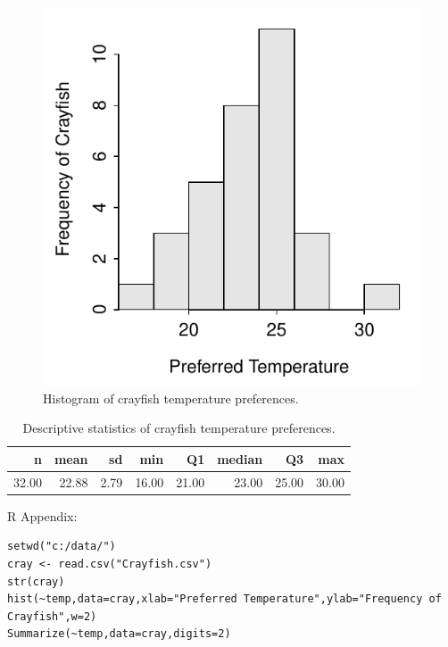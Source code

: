 \documentclass[10pt,openany]{book}\usepackage[]{graphicx}\usepackage[]{color}
\makeatletter
\newenvironment{kframe}{%
 \def\at@end@of@kframe{}%
 \ifinner\ifhmode%
  \def\at@end@of@kframe{\end{minipage}}%
  \begin{minipage}{\columnwidth}%
 \fi\fi%
 \def\FrameCommand##1{\hskip\@totalleftmargin \hskip-\fboxsep
 \colorbox{shadecolor}{##1}\hskip-\fboxsep
     \hskip-\linewidth \hskip-\@totalleftmargin \hskip\columnwidth}%
 \MakeFramed {\advance\hsize-\width
   \@totalleftmargin\z@ \linewidth\hsize
   \@setminipage}}%
 {\par\unskip\endMakeFramed%
 \at@end@of@kframe}
\newenvironment{knitrout}{}{} %
\makeatother
\begin{document}
\begin{knitrout}
\color{fgcolor}\begin{figure}[hbtp]

{\centering \includegraphics[width=.4\linewidth]{Figs/CrayfishTempHist-1} 

}

\caption[Histogram of crayfish temperature preferences]{Histogram of crayfish temperature preferences.}\label{fig:CrayfishTempHist}
\end{figure}


\end{knitrout}

\begin{table}[ht]
\centering
\caption{Descriptive statistics of crayfish temperature preferences.} 
\label{tab:CrayfishTempStats}
\begin{tabular}{rrrrrrrr}
  \hline
n & mean & sd & min & Q1 & median & Q3 & max \\ 
  \hline
32.00 & 22.88 & 2.79 & 16.00 & 21.00 & 23.00 & 25.00 & 30.00 \\ 
   \hline
\end{tabular}
\end{table}


\begin{minipage}{\textwidth}
R Appendix:
\begin{knitrout}
\color{fgcolor}\begin{kframe}
\begin{verbatim}
setwd("c:/data/")
cray <- read.csv("Crayfish.csv")
str(cray)
hist(~temp,data=cray,xlab="Preferred Temperature",ylab="Frequency of Crayfish",w=2)
Summarize(~temp,data=cray,digits=2)
\end{verbatim}
\end{kframe}
\end{knitrout}
\end{minipage}
\end{document}
